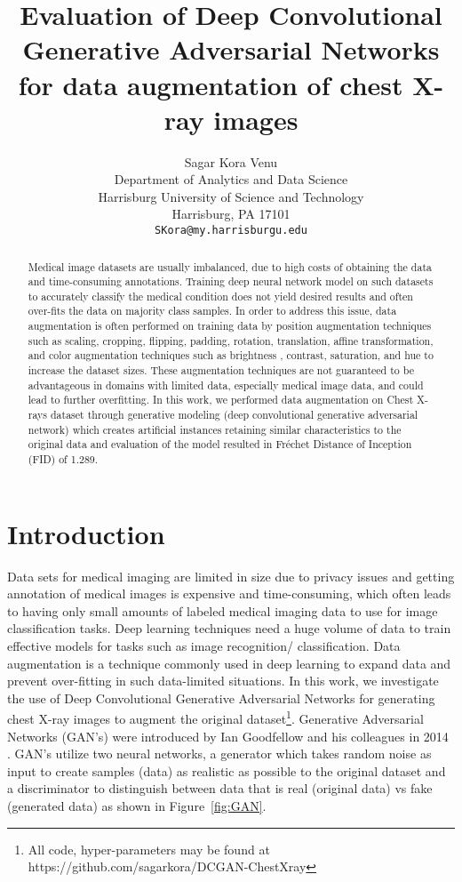 \documentclass{article}
\title{Evaluation of Deep Convolutional Generative Adversarial Networks for data augmentation of chest X-ray images}
\author{
  Sagar Kora Venu \\
  Department of Analytics and Data Science\\
  Harrisburg University of Science and Technology\\
  Harrisburg, PA 17101 \\
  \texttt{SKora@my.harrisburgu.edu}
}
\begin{document}
\maketitle

\begin{abstract}
Medical image datasets are usually imbalanced, due to high costs of obtaining the data and time-consuming annotations. Training deep neural network model on such datasets to accurately classify the medical condition does not yield desired results and often over-fits the data on majority class samples. In order to address this issue, data augmentation is often performed on training data by position augmentation techniques such as scaling, cropping, flipping, padding, rotation, translation, affine transformation, and color augmentation techniques such as brightness , contrast, saturation, and hue to increase the dataset sizes. These augmentation techniques are not guaranteed to be advantageous in domains with limited data, especially medical image data, and could lead to further overfitting. In this work, we performed data augmentation on Chest X-rays dataset through generative modeling (deep convolutional generative adversarial network) which creates artificial instances retaining similar characteristics to the original data and evaluation of the model resulted in Fréchet Distance of Inception (FID) of 1.289.
\end{abstract}



\section*{Introduction}
Data sets for medical imaging are limited in size due to privacy issues and getting annotation of medical images is expensive and time-consuming, which often leads to having only small amounts of labeled medical imaging data to use for image classification tasks. Deep learning techniques need a huge volume of data to train effective models for tasks such as image recognition/ classification. Data augmentation is a technique commonly used in deep learning to expand data and prevent over-fitting in such data-limited situations. In this work, we investigate the use of Deep Convolutional Generative Adversarial Networks for generating chest X-ray images to augment the original dataset\footnote{All code, hyper-parameters may be found at https://github.com/sagarkora/DCGAN-ChestXray}. Generative Adversarial Networks (GAN’s) were introduced by Ian Goodfellow and his colleagues in 2014 \cite{goodfellow2014generative}. GAN’s utilize two neural networks, a generator which takes random noise as input to create samples (data) as realistic as possible to the original dataset and a discriminator to distinguish between data that is real (original data) vs fake (generated data) as shown in Figure~\ref{fig:GAN}.
\end{document}
